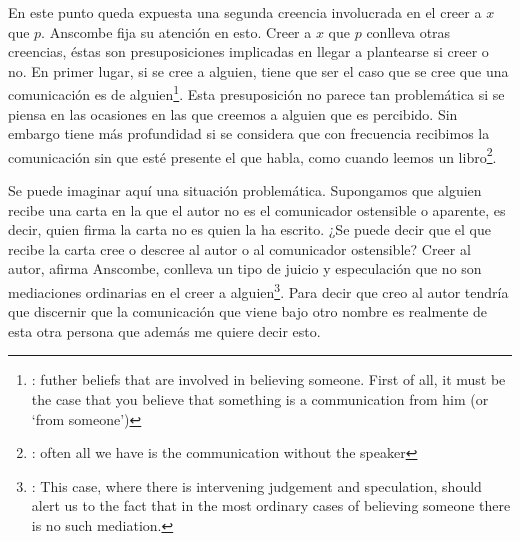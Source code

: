 En este punto queda expuesta una segunda creencia involucrada en el creer a $x$ que $p$. Anscombe fija su atención en esto. Creer a $x$ que $p$ conlleva otras creencias, éstas son presuposiciones implicadas en llegar a plantearse si creer o no. En primer lugar, si se cree a alguien, tiene que ser el caso que se cree que una comunicación es de alguien\footnote{\cite[Cf.~][6]{anscombe2008faith:tobelieve}: futher beliefs that are involved in believing someone. First of all, it must be the case that you believe that something is a communication from him (or `from someone')}. Esta presuposición no parece tan problemática si se piensa en las ocasiones en las que creemos a alguien que es percibido. Sin embargo tiene más profundidad si se considera que con frecuencia recibimos la comunicación sin que esté presente el que habla, como cuando leemos un libro\footnote{\cite[Cf.~][5]{anscombe2008faith:tobelieve}: often all we have is the communication without the speaker}.

Se puede imaginar aquí una situación problemática. Supongamos que alguien recibe una carta en la que el autor no es el comunicador ostensible o aparente, es decir, quien firma la carta no es quien la ha escrito. ¿Se puede decir que el que recibe la carta cree o descree al autor o al comunicador ostensible? Creer al autor, afirma Anscombe, conlleva un tipo de juicio y especulación que no son mediaciones ordinarias en el creer a alguien\footnote{\cite[Cf.~][7]{anscombe2008faith:tobelieve}: This case, where there is intervening judgement and speculation, should alert us to the fact that in the most ordinary cases of believing someone there is no such mediation.}. Para decir que creo al autor tendría que discernir que la comunicación que viene bajo otro nombre es realmente de esta otra persona que además me quiere decir esto.

